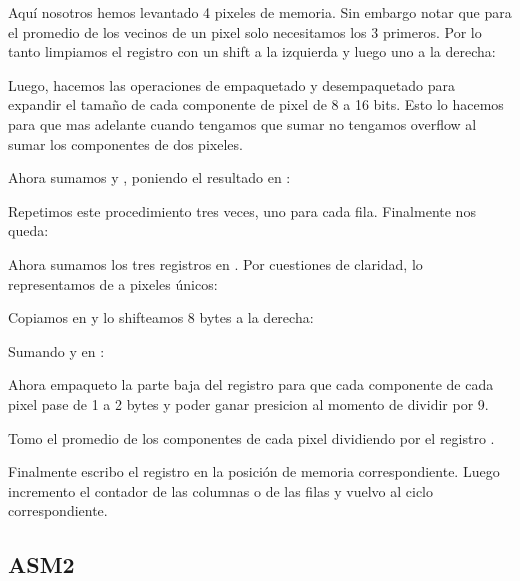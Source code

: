 Aquí nosotros hemos levantado 4 pixeles de memoria. Sin embargo notar que para el promedio de los vecinos de un pixel solo necesitamos los 3 primeros. Por lo tanto limpiamos el registro  con un shift a la izquierda y luego uno a la derecha:


Luego, hacemos las operaciones de empaquetado y desempaquetado para expandir el tamaño de cada componente de pixel de 8 a 16 bits. Esto lo hacemos para que mas adelante cuando tengamos que sumar no tengamos overflow al sumar los componentes de dos pixeles.



Ahora sumamos  y , poniendo el resultado en :


Repetimos este procedimiento tres veces, uno para cada fila. Finalmente nos queda:




Ahora sumamos los tres registros en . Por cuestiones de claridad, lo representamos de a pixeles únicos:


Copiamos  en  y lo shifteamos 8 bytes a la derecha:


Sumando  y  en :


Ahora empaqueto la parte baja del registro para que cada componente de cada pixel pase de 1 a 2 bytes y poder ganar presicion al momento de dividir por 9.


Tomo el promedio de los componentes de cada pixel dividiendo por el registro .


Finalmente escribo el registro en la posición de memoria correspondiente. Luego incremento el contador de las columnas o de las filas y vuelvo al ciclo correspondiente.

\pagebreak

\subsection{ASM2}

